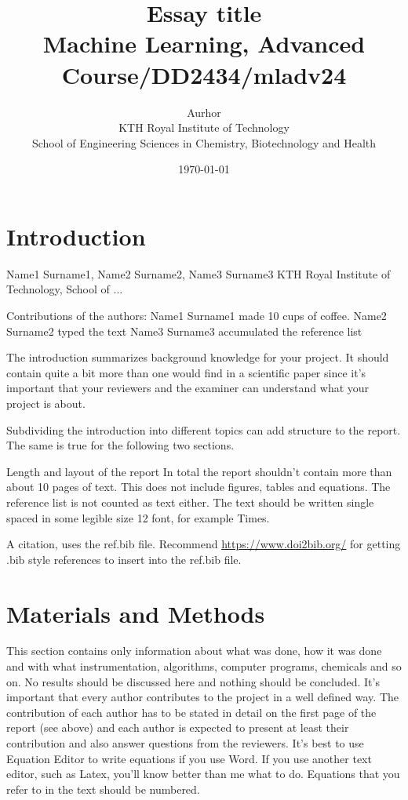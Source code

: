 \documentclass{article}
\title{Essay title\\\Large{Machine Learning, Advanced Course/DD2434/mladv24}}
\author{Aurhor \\ KTH Royal Institute of Technology\\ School of Engineering Sciences in Chemistry, Biotechnology and Health}
\date{\today}
\begin{document}
\maketitle
\thispagestyle{fancy}
\clearpage
\tableofcontents
\thispagestyle{fancy}

\clearpage
\fancyfoot[C]{\thepage}
\begin{multicols}{2}

\section*{Introduction}

Name1 Surname1, Name2 Surname2, Name3 Surname3 
KTH Royal Institute of Technology, School of ... 

 
Contributions of the authors: 
Name1 Surname1 made 10 cups of coffee. 
Name2 Surname2 typed the text 
Name3 Surname3 accumulated the reference list 



The introduction summarizes background knowledge for your project. It should contain quite 
a bit more than one would find in a scientific paper since it’s important that your reviewers 
and the examiner can understand what your project is about. 



Subdividing the introduction into different topics can add structure to the report. 
The same is true for the following two sections. 



Length and layout of the report 
In total the report shouldn't contain more than about 10 pages of text. This does not include 
figures, tables and equations. The reference list is not counted as text either. 
The text should be written single spaced in some legible size 12 font, for example Times. 



A citation, uses the ref.bib file.\cite{Beauchamp2015}
Recommend \href{https://www.doi2bib.org/}{https://www.doi2bib.org/} for getting .bib style references to insert into the ref.bib file.

\section*{Materials and Methods}

This section contains only information about what was done, how it was done and with what 
instrumentation, algorithms, computer programs, chemicals and so on. 
No results should be discussed here and nothing should be concluded. 
It’s important that every author contributes to the project in a well defined way. 
The contribution of each author has to be stated in detail on the first page of the report (see 
above) and each author is expected to present at least their contribution and also answer 
questions from the reviewers. 
It’s best to use Equation Editor to write equations if you use Word. If you use another text 
editor, such as Latex, you’ll know better than me what to do. 
Equations that you refer to in the text should be numbered. 



\end{multicols}
\end{document}
